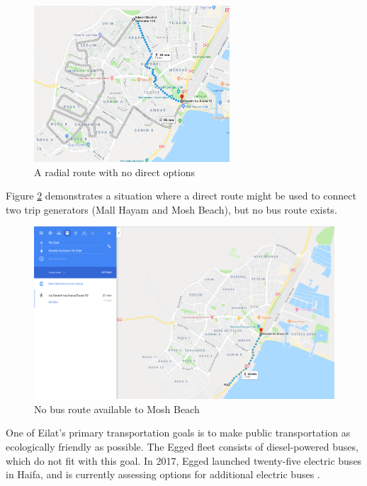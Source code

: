 \documentclass[12pt]{article}                               %
\begin{document}
\begin{figure}[H]
    \centering
    \includegraphics[width=0.65\textwidth]{images/bad_bus_2.png}
    \caption{A radial route with no direct options}
    \label{img:bad_bus_2}
\end{figure}

Figure \ref{img:bad_bus_3} demonstrates a situation where a direct route might be used to connect two trip generators (Mall Hayam and Mosh Beach), but no bus route exists.

\begin{figure}[H]
    \centering
    \includegraphics[width=1\textwidth]{images/bad_bus_3.png}
    \caption{No bus route available to Mosh Beach}
    \label{img:bad_bus_3}
\end{figure}

One of Eilat's primary transportation goals is to make public transportation as ecologically friendly as possible. The Egged fleet consists of diesel-powered buses, which do not fit with this goal. In 2017, Egged launched twenty-five electric buses in Haifa, and is currently assessing options for additional electric buses \cite{KerenKayemethLelsraelJewishNationalFund2017}.
\end{document}
